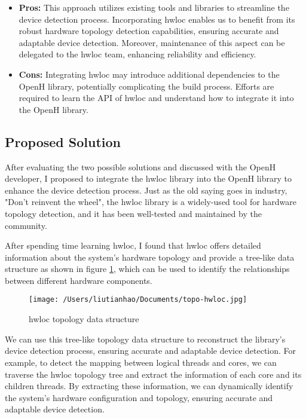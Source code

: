 \documentclass[13pt]{article}
\begin{document}
\begin{itemize}
    \item \textbf{Pros:}
    This approach utilizes existing tools and libraries to streamline the device detection process. 
    Incorporating hwloc enables us to benefit from its robust hardware topology detection capabilities, ensuring accurate and adaptable device detection. 
    Moreover, maintenance of this aspect can be delegated to the hwloc team, enhancing reliability and efficiency.

    \item \textbf{Cons:}
    Integrating hwloc may introduce additional dependencies to the OpenH library, potentially complicating the build process. 
    Efforts are required to learn the API of hwloc and understand how to integrate it into the OpenH library.
\end{itemize}

\subsection{Proposed Solution}
After evaluating the two possible solutions and discussed with the OpenH developer, I proposed to integrate the hwloc library into the OpenH library to enhance the device detection process.
Just as the old saying goes in industry, "Don't reinvent the wheel", the hwloc library is a widely-used tool for hardware topology detection, and it has been well-tested and maintained by the community.

After spending time learning hwloc, I found that hwloc offers detailed information about the system's hardware topology and provide a tree-like data structure as shown in figure \ref{fig:hwloc}, which can be used to identify the relationships between different hardware components. 

\begin{figure}[ht]
    \centering
    \texttt{[image: /Users/liutianhao/Documents/topo-hwloc.jpg]}
    \caption{hwloc topology data structure}
    \label{fig:hwloc}
\end{figure}

We can use this tree-like topology data structure to reconstruct the library's device detection process, ensuring accurate and adaptable device detection.
For example, to detect the mapping between logical threads and cores, we can traverse the hwloc topology tree and extract the information of each core and its children threads.
By extracting these information, we can dynamically identify the system's hardware configuration and topology, ensuring accurate and adaptable device detection.
\end{document}
